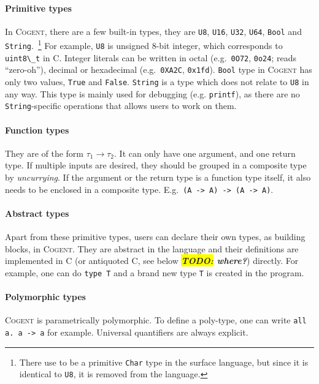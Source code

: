 \documentclass[a4paper]{article}
\newcommand{\inlinecogent}[1]{\lstinline[language=Cogent,basicstyle=\ttfamily\normalsize]{#1}\xspace}
\newcommand{\inlinec}[1]{\lstinline[language=antiC,basicstyle=\ttfamily\normalsize]{#1}\xspace}
\newcommand{\TODO}[1]{\textbf{\textsl{\colorbox{yellow}{TODO:} #1}}}
\newcommand{\todo}[1]{\TODO{#1}}
\newcommand{\cogent}{\textsc{Cogent}\xspace}
\begin{document}
\paragraph{Primitive types} In \cogent, there are a few built-in types, they are \inlinecogent{U8},
\inlinecogent{U16}, \inlinecogent{U32}, \inlinecogent{U64}, \inlinecogent{Bool} and \inlinecogent{String}.~\footnote{There
use to be a primitive \inlinecogent{Char} type in the surface language, but since it is
identical to \inlinecogent{U8}, it is removed from the language.} For example, \inlinecogent{U8} is unsigned
8-bit integer, which corresponds to
\inlinec{uint8\_t} in C. Integer literals can be written in octal (e.g.\ \inlinecogent{0O72}, \inlinecogent{0o24};
reads ``zero-oh''), decimal or hexadecimal (e.g.\ \inlinecogent{0XA2C}, \inlinecogent{0x1fd}). \inlinecogent{Bool}
type in \cogent has only two values, \inlinecogent{True} and \inlinecogent{False}.
\inlinecogent{String} is a type which does not relate to \inlinecogent{U8} in any way. This type is mainly used
for debugging (e.g. \inlinecogent{printf}),
as there are no \inlinecogent{String}-specific operations that allows users to work on them.

\paragraph{Function types} They are of the form $\tau_1 \rightarrow \tau_2$. It can only have one argument, and one return type.
If multiple inputs are desired, they should be grouped in a composite type by \emph{uncurrying}. If the argument or the return type
is a function type itself, it also needs to be enclosed in a composite type. E.g.\ \inlinecogent{(A -> A) -> (A -> A)}.

\paragraph{Abstract types} Apart from these primitive types, users can declare their own types, as building blocks, in \cogent.
They are abstract in the language and their definitions are implemented in C (or antiquoted C, see below \todo{where?}) directly.
For example, one can do \inlinecogent{type T} and a brand new type \inlinecogent{T} is created in the program.

\paragraph{Polymorphic types} \cogent is parametrically polymorphic. To define a poly-type, one can write \inlinecogent{all a. a -> a}
for example. Universal quantifiers are always explicit.
\end{document}

